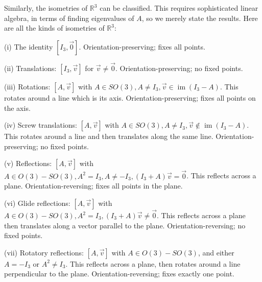 \documentclass[leqno]{book}
\begin{document}
Similarly, the isometries of $\mathbb R^3$ can be classified.  This requires sophisticated linear algebra, in terms of finding eigenvalues of $A$, so we merely state the results.  Here are all the kinds of isometries of $\mathbb R^3$:

(i) The identity $[I_3,\vec 0]$.  Orientation-preserving; fixes all points.

(ii) Translations: $[I_3,\vec v]$ for $\vec v\ne\vec 0$.  Orientation-preserving; no fixed points.

(iii) Rotations: $[A,\vec v]$ with $A\in SO(3),A\ne I_3,\vec v\in\operatorname{im}(I_3-A)$.  This rotates around a line which is its axis.  Orientation-preserving; fixes all points on the axis.

(iv) Screw translations: $[A,\vec v]$ with $A\in SO(3),A\ne I_3,\vec v\notin\operatorname{im}(I_3-A)$.  This rotates around a line and then translates along the same line.  Orientation-preserving; no fixed points.

(v) Reflections: $[A,\vec v]$ with $A\in O(3)-SO(3),A^2=I_3,A\ne -I_3,(I_3+A)\vec v=\vec 0$.  This reflects across a plane.  Orientation-reversing; fixes all points in the plane.

(vi) Glide reflections: $[A,\vec v]$ with $A\in O(3)-SO(3),A^2=I_3,(I_3+A)\vec v\ne\vec 0$.  This reflects across a plane then translates along a vector parallel to the plane.  Orientation-reversing; no fixed points.

(vii) Rotatory reflections: $[A,\vec v]$ with $A\in O(3)-SO(3)$, and either $A=-I_3$ or $A^2\ne I_3$.  This reflects across a plane, then rotates around a line perpendicular to the plane.  Orientation-reversing; fixes exactly one point.
\end{document}
